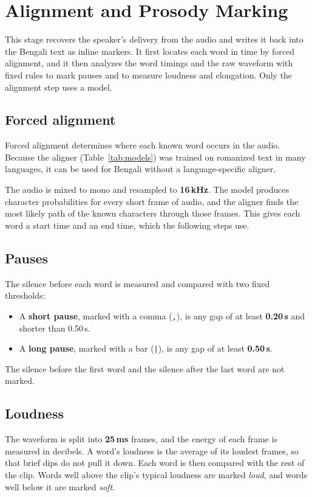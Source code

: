 \section{Alignment and Prosody Marking}

This stage recovers the speaker's delivery from the audio and writes it back into the Bengali text as inline markers. It first locates each word in time by forced alignment, and it then analyzes the word timings and the raw waveform with fixed rules to mark pauses and to measure loudness and elongation. Only the alignment step uses a model.

\subsection{Forced alignment}
Forced alignment determines where each known word occurs in the audio. Because the aligner (Table~\ref{tab:models}) was trained on romanized text in many languages, it can be used for Bengali without a language-specific aligner.

The audio is mixed to mono and resampled to \textbf{16\,kHz}. The model produces character probabilities for every short frame of audio, and the aligner finds the most likely path of the known characters through those frames. This gives each word a start time and an end time, which the following steps use.

\subsection{Pauses}
The silence before each word is measured and compared with two fixed thresholds:
\begin{itemize}[nosep]
  \item A \textbf{short pause}, marked with a comma (\texttt{,}), is any gap of at least \textbf{0.20\,s} and shorter than 0.50\,s.
  \item A \textbf{long pause}, marked with a bar (\texttt{|}), is any gap of at least \textbf{0.50\,s}.
\end{itemize}
The silence before the first word and the silence after the last word are not marked.

\subsection{Loudness}
The waveform is split into \textbf{25\,ms} frames, and the energy of each frame is measured in decibels. A word's loudness is the average of its loudest frames, so that brief dips do not pull it down. Each word is then compared with the rest of the clip. Words well above the clip's typical loudness are marked \emph{loud}, and words well below it are marked \emph{soft}.

